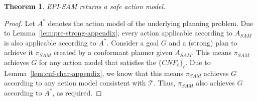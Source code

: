 \documentclass[letterpaper]{article} %
\newcommand{\pre}{\textit{pre}}
\newcommand{\cnf}{\textit{CNF}}
\newcommand{\realm}{\ensuremath{M^*}\xspace}
\newcommand{\sam}{\textit{SAM}\xspace}
\newcommand{\sgam}{\textit{SGAM}\xspace}
\newtheorem{theorem}{Theorem}
\begin{document}



\begin{theorem}\label{thm:episam-safe-appendix}
EPI-SAM returns a safe action model.
\end{theorem}
\begin{proof}
Let $A^*$ denotes the action model of the underlying planning problem.
Due to Lemma~\ref{lem:pre-strong-appendix}, every action applicable according to $A_\sam$ is also applicable according to $A^*$. 
Consider a goal $G$ and a (strong) plan to achieve it $\pi_\sam$ created by a conformant planner given $A_\sam$. 
This means $\pi_\sam$ achieves $G$ for any action model that satisfies the $\{\cnf_\ell\}_\ell$. 
Due to Lemma~\ref{lem:cnf-char-appendix}, we know that this means $\pi_\sam$ achieves $G$ according to any action model consistent with $\mathcal{T}$. 
Thus, $\pi_\sam$ also achieves $G$ according to $A^*$, as required. 
\end{proof}


\end{document}
